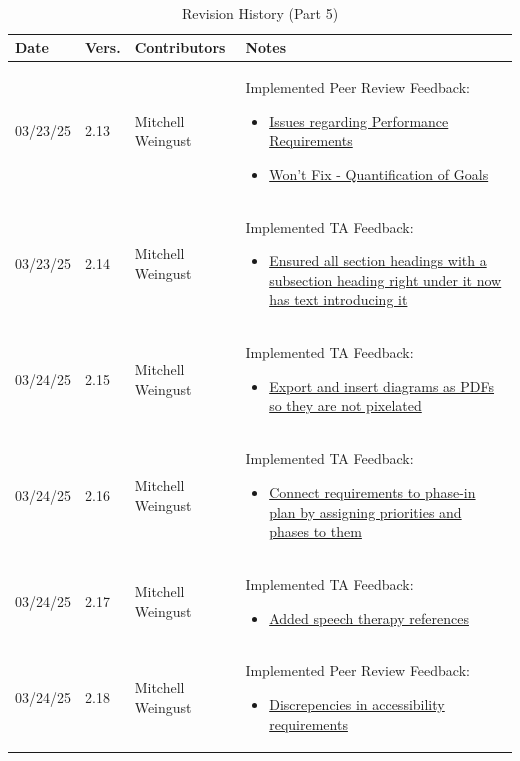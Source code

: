 \documentclass[12pt]{article}
\begin{document}
~\newpage
\begin{table}[H]
  \centering
  \caption{Revision History (Part 5)}
  \label{TblRevisionHistoryPart1}
  \begin{tabularx}{\textwidth}{p{1.5cm} p{1cm} p{3.5cm} X}
      \toprule
      \textbf{Date} & \textbf{Vers.} & \textbf{Contributors} & \textbf{Notes} \\
      \midrule
      03/23/25 & 2.13 & Mitchell Weingust & Implemented Peer Review Feedback:
      \begin{itemize}[leftmargin=*]
        \item \href{https://github.com/parishanizam/TeleHealth/issues/116}{Issues regarding Performance Requirements}
        \item \href{https://github.com/parishanizam/TeleHealth/issues/118}{Won't Fix - Quantification of Goals}
      \end{itemize} \\
      03/23/25 & 2.14 & Mitchell Weingust & Implemented TA Feedback: 
      \begin{itemize}[leftmargin=*]
        \item \href{https://github.com/parishanizam/TeleHealth/issues/191}{Ensured all section headings with a subsection heading right under it now has text introducing it}
      \end{itemize} \\
      03/24/25 & 2.15 & Mitchell Weingust & Implemented TA Feedback: 
      \begin{itemize}[leftmargin=*]
        \item \href{https://github.com/parishanizam/TeleHealth/issues/190}{Export and insert diagrams as PDFs so they are not pixelated}
      \end{itemize} \\
      03/24/25 & 2.16 & Mitchell Weingust & Implemented TA Feedback: 
      \begin{itemize}[leftmargin=*]
        \item \href{https://github.com/parishanizam/TeleHealth/issues/198}{Connect requirements to phase-in plan by assigning priorities and phases to them}
      \end{itemize} \\
      03/24/25 & 2.17 & Mitchell Weingust & Implemented TA Feedback: 
      \begin{itemize}[leftmargin=*]
        \item \href{https://github.com/parishanizam/TeleHealth/issues/208}{Added speech therapy references}
      \end{itemize} \\
      03/24/25 & 2.18 & Mitchell Weingust & Implemented Peer Review Feedback: 
      \begin{itemize}[leftmargin=*]
        \item \href{https://github.com/parishanizam/TeleHealth/issues/125}{Discrepencies in accessibility requirements}
      \end{itemize} \\
    \end{tabularx}
  \end{table}
\end{document}
